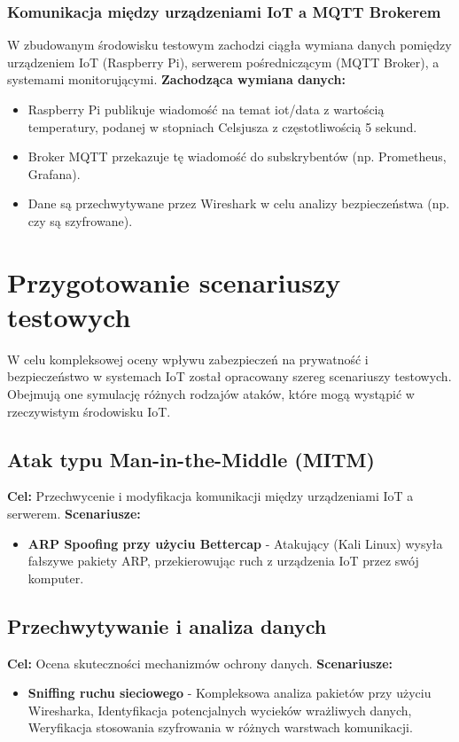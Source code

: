 \subsubsection{Komunikacja między urządzeniami IoT a MQTT Brokerem}
W zbudowanym środowisku testowym zachodzi ciągła wymiana danych pomiędzy urządzeniem IoT (Raspberry Pi), serwerem pośredniczącym (MQTT Broker), a systemami monitorującymi.
\textbf{Zachodząca wymiana danych:}
\begin{itemize}
    \item Raspberry Pi publikuje wiadomość na temat iot/data z wartością temperatury, podanej w stopniach Celsjusza z częstotliwością 5 sekund.
    \item Broker MQTT przekazuje tę wiadomość do subskrybentów (np. Prometheus, Grafana).
    \item Dane są przechwytywane przez Wireshark w celu analizy bezpieczeństwa (np. czy są szyfrowane).
\end{itemize}

\section{Przygotowanie scenariuszy testowych}
W celu kompleksowej oceny wpływu zabezpieczeń na prywatność i bezpieczeństwo w systemach IoT został opracowany szereg scenariuszy testowych. Obejmują one symulację różnych rodzajów ataków, które mogą wystąpić w rzeczywistym środowisku IoT.

\subsection{Atak typu Man-in-the-Middle (MITM)}
\textbf{Cel: } Przechwycenie i modyfikacja komunikacji między urządzeniami IoT a serwerem.
\textbf{Scenariusze:}
\begin{itemize}
    \item \textbf{ARP Spoofing przy użyciu Bettercap} - Atakujący (Kali Linux) wysyła fałszywe pakiety ARP, przekierowując ruch z urządzenia IoT przez swój komputer.
\end{itemize}
\subsection{Przechwytywanie i analiza danych}
\textbf{Cel: } Ocena skuteczności mechanizmów ochrony danych.
\textbf{Scenariusze:}
\begin{itemize}
    \item \textbf{Sniffing ruchu sieciowego} - Kompleksowa analiza pakietów przy użyciu Wiresharka, Identyfikacja potencjalnych wycieków wrażliwych danych, Weryfikacja stosowania szyfrowania w różnych warstwach komunikacji.
\end{itemize}
